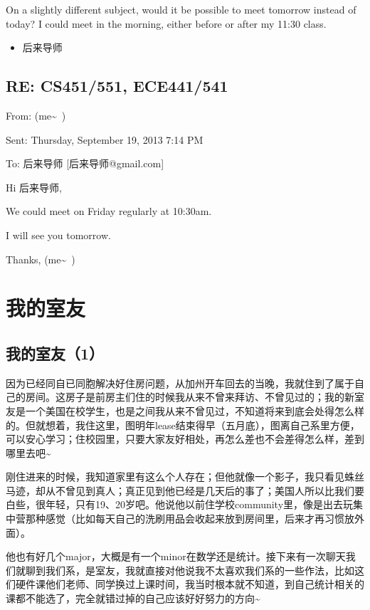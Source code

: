 \documentclass[12pt]{book}
\begin{document}
On a slightly different subject, would it be possible to meet tomorrow instead of today? I could meet in the morning, either before or after my 11:30 class.

\begin{itemize}
\item 后来导师
\end{itemize}

\section{RE: CS451/551, ECE441/541}
\label{sec-12-4}
From: (me\textasciitilde{}~)

Sent:         Thursday, September 19, 2013 7:14 PM

To: 后来导师 [后来导师@gmail.com]        

Hi 后来导师, 

We could meet on Friday regularly at 10:30am. 

I will see you tomorrow. 

Thanks,
(me\textasciitilde{}~)

\chapter{我的室友}
\label{sec-13}
\section{我的室友（1）}
\label{sec-13-1}

因为已经同自已同胞解决好住房问题，从加州开车回去的当晚，我就住到了属于自己的房间。这房子是前房主们住的时候我从来不曾来拜访、不曾见过的；我的新室友是一个美国在校学生，也是之间我从来不曾见过，不知道将来到底会处得怎么样的。但就想着，我住这里，图明年lease结束得早（五月底），图离自己系里方便，可以安心学习；住校园里，只要大家友好相处，再怎么差也不会差得怎么样，差到哪里去吧\textasciitilde{}~

刚住进来的时候，我知道家里有这么个人存在；但他就像一个影子，我只看见蛛丝马迹，却从不曾见到真人；真正见到他已经是几天后的事了；美国人所以比我们要白些，很年轻，只有19、20岁吧。他说他以前住学校community里，像是出去玩集中营那种感觉（比如每天自己的洗刷用品会收起来放到房间里，后来才再习惯放外面）。

他也有好几个major，大概是有一个minor在数学还是统计。接下来有一次聊天我们就聊到我们系，是室友，我就直接对他说我不太喜欢我们系的一些作法，比如这们硬件课他们老师、同学换过上课时间，我当时根本就不知道，到自己统计相关的课都不能选了，完全就错过掉的自己应该好好努力的方向\textasciitilde{}~
\end{document}
